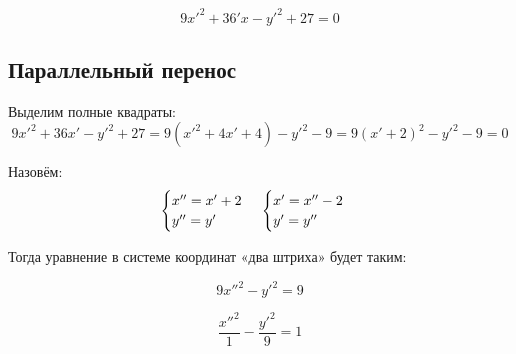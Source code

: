 \documentclass[12pt, a4paper]{article}
\begin{document}
    \begin{equation}
        9x'^2 + 36'x - y'^2 + 27 = 0
    \end{equation}

    \subsection{Параллельный перенос}

    Выделим полные квадраты:
    \begin{equation}
        9x'^2 + 36x' - y'^2 + 27 = 9(x'^2 + 4x' + 4) - y'^2 - 9 = 9(x' + 2)^2 - y'^2 - 9 = 0
    \end{equation}
    
    Назовём:
    \begin{equation}
        \begin{cases}
            x'' = x' + 2 \\
            y'' = y'
        \end{cases} \\
        \begin{cases}
            x' = x'' - 2 \\
            y' = y''
        \end{cases}
    \end{equation}
    
    Тогда уравнение в системе координат «два штриха» будет таким:
    
    \begin{equation}
        9x''^2 - y'^2 = 9
    \end{equation}

    \begin{equation}
        \frac{x''^2}{1} - \frac{y'^2}{9} = 1
    \end{equation}
\end{document}
